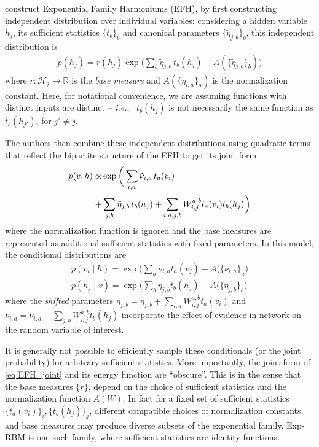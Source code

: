 \documentclass[twoside]{article}
\theoremstyle{plain}
\theoremstyle{definition}
\theoremstyle{remark}
\newcommand{\ie}[0]{\emph{i.e.},~}
\newcommand{\refEq}[1]{\cref{#1}}%
\newcommand{\boldit}[1]{\ensuremath{#1}}
\newcommand{\sfit}[1]{\ensuremath{#1}}
\renewcommand{\Re}[0]{\ensuremath{\mathbb{R}}}%
\newcommand{\xx}[0]{\ensuremath{\boldit{v}}}%
\newcommand{\x}[0]{\ensuremath{{v}}}%
\newcommand{\yy}[0]{\ensuremath{\boldit{h}}}%
\newcommand{\y}[0]{\ensuremath{{h}}}%
\newcommand{\Y}[0]{\ensuremath{{H}}}%
\newcommand{\WW}[0]{\ensuremath{\boldit{W}}}%
\newcommand{\W}[0]{\ensuremath{{W}}}%
\newcommand{\pp}[0]{\ensuremath{\sfit{p}}}%
\newcommand{\ZZ}[0]{\ensuremath{\sfit{A}}}%
\newcommand{\hh}[0]{\ensuremath{\sfit{r}}}%
\begin{document}
\citet{welling2004exponential} construct Exponential Family Harmoniums (EFH), by first 
constructing independent distribution over individual variables: considering a hidden variable $\y_j$, its sufficient statistics $\{t_b\}_b$  and
canonical parameters $\{\tilde{\eta}_{j,b}\}_b$, this independent distribution is
\begin{align*}
  \pp(\y_j) = \hh(\y_j) \exp\bigg(\sum_{b} \tilde{\eta}_{j,b}\, t_b(\y_j) -\ZZ(\{\tilde{\eta}_{j,b}\}_b) \bigg)
\end{align*}
where $\hh: \mathcal{\Y}_j \to \Re$ is the \textit{base measure} and $\ZZ(\{\eta_{i,a}\}_a)$
is the normalization constant. 
Here, for notational convenience, we are assuming functions with distinct inputs are distinct -- \ie 
$t_b(\y_j)$ is not necessarily the same function as $t_b(\y_{j'})$, for $j' \neq j$.

The authors then combine these independent distributions using quadratic terms that reflect the bipartite structure of the EFH to get its joint form
\begin{align}
  \label{eq:EFH_joint}
  \pp(\xx, \yy) \propto &\exp\bigg(\sum_{i,a} \tilde{\nu}_{i,a} \,t_a(\x_i) \\
+ &\sum_{j,b} \tilde{\eta}_{j,b}\, t_b(\y_j) + \sum_{i,a,j,b} \W_{i,j}^{a,b} t_a(\x_i) t_b(\y_j) \bigg) \notag
\end{align}
where the normalization function is ignored and the base measures are represented as additional sufficient statistics with fixed parameters. In this model, the conditional distributions are 
\begin{align*}
  \pp(\x_i \mid \yy) = \exp\bigg( \sum_{a} {\nu}_{i,a} t_a(\x_j) -\ZZ(\{{\nu}_{i,a}\}_a \bigg)\\
  \pp(\y_j \mid \xx) = \exp\bigg( \sum_{b} {\eta}_{j,b} t_b(\y_j) -\ZZ(\{{\eta}_{j,b}\}_b \bigg)
\end{align*}
where the \textit{shifted} parameters ${\eta}_{j,b} = \tilde{\eta}_{j,b} + \sum_{i,a} \W_{i,j}^{a,b} t_a(\x_i)$ 
and ${\nu}_{i,a} = \tilde{\nu}_{i,a} + \sum_{j,b} \W_{i,j}^{a,b} t_b(\y_j)$
incorporate the effect of evidence in network on the random variable of interest. 

It is generally not possible to efficiently sample these conditionals (or the joint probability) for arbitrary sufficient statistics.
More importantly, the joint form of \refEq{eq:EFH_joint} and its energy function are ``obscure''. This is in the sense that   
the base measures $\{\hh\}$, depend on the choice of sufficient statistics and the normalization function $A(\WW)$. In fact for a fixed set of sufficient statistics $\{t_a(\x_i)\}_i, \{t_b(\y_j)\}_j$, different compatible choices of normalization constants and base measures may produce diverse subsets of the exponential family. Exp-RBM is one such family, where sufficient statistics are identity functions. 
\end{document}

